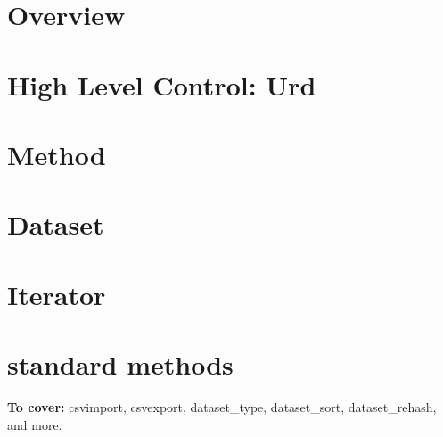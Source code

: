 \documentclass[a4paper]{report}
\begin{document}




\chapter{Overview}


\chapter{High Level Control:  Urd}


\chapter{Method}


\chapter{Dataset}


\chapter{Iterator}


\chapter{standard methods}
\textbf{To cover:} csvimport, csvexport, dataset\_type, dataset\_sort, dataset\_rehash, and more.


%
\end{document}
